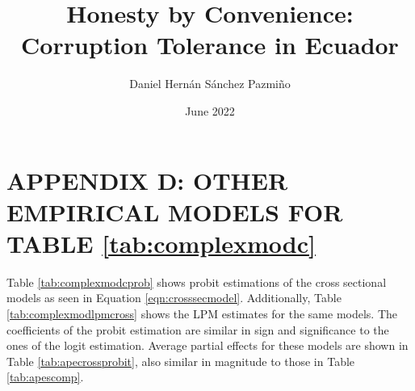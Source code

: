 \documentclass[12pt,a4]{article}
\title{Honesty by Convenience: Corruption Tolerance in Ecuador}
\author{Daniel Hernán Sánchez Pazmiño}
\date{June 2022}
\begin{document}


\section{APPENDIX D: OTHER EMPIRICAL MODELS FOR TABLE \ref{tab:complexmodc}}

Table \ref{tab:complexmodcprob} shows probit estimations of the cross sectional models as seen in Equation \ref{eqn:crosssecmodel}. Additionally, Table \ref{tab:complexmodlpmcross} shows the LPM estimates for the same models. The coefficients of the probit estimation are similar in sign and significance to the ones of the logit estimation. Average partial effects for these models are shown in Table \ref{tab:apecrossprobit}, also similar in magnitude to those in Table \ref{tab:apescomp}.
\end{document}
